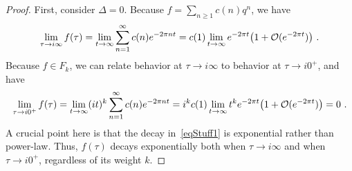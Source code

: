 \documentclass[11pt,a4paper]{article}
\begin{document}
\begin{proof}
First, consider $\Delta = 0$. Because $f = \sum_{n \geq 1} c(n) q^n$, we have
\begin{align}
\lim_{\tau \to i \infty} f(\tau) = \lim_{t \to \infty} \sum_{n = 1}^{\infty} c(n) e^{-2 \pi n t} = c(1) \lim_{t \to \infty} e^{-2\pi t} \big( 1 + {\cal O}(e^{-2\pi t}) \big)~.\label{eqStuff1}
\end{align}
Because $f \in F_k$, we can relate behavior at $\tau \to i \infty$ to behavior at $\tau \to i 0^+$, and have
\begin{align}
\lim_{\tau \to i 0^+} f(\tau) = \lim_{t \to \infty} (i t)^{k} \sum_{n = 1}^{\infty} c(n) e^{-2 \pi n t} = i^k c(1) \lim_{t \to \infty} t^k e^{-2\pi t} \big( 1 + {\cal O}(e^{-2\pi t}) \big) = 0~.\label{eqStuff2}
\end{align}
A crucial point here is that the decay in~\eqref{eqStuff1} is exponential rather than power-law. Thus, $f(\tau)$ decays exponentially both when $\tau \to i \infty$ and when $\tau \to i 0^+$, regardless of its weight $k$. 


\end{proof}
\end{document}
